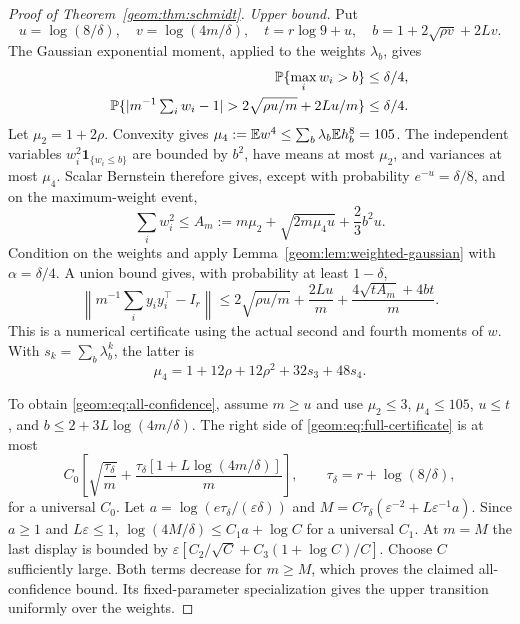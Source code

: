 \documentclass[11pt,a4paper]{article}
\theoremstyle{definition}\newtheorem{definition}[theorem]{Definition}
\theoremstyle{remark}\newtheorem{remark}[theorem]{Remark}
\numberwithin{equation}{section}
\begin{document}
\begin{proof}[Proof of Theorem~\ref{geom:thm:schmidt}]
\label{proof:schmidt}
\emph{Upper bound.}
Put
\[
 u=\log(8/\delta),\quad v=\log(4m/\delta),\quad
 t=r\log9+u,\quad b=1+2\sqrt{\rho v}+2Lv.
\]
The Gaussian exponential moment, applied to the weights $\lambda_b$,
gives
\begin{align*}
 \Pp\{\max_iw_i>b\}&\le\delta/4,\\
 \Pp\{|m^{-1}\textstyle\sum_iw_i-1|>
             2\sqrt{\rho u/m}+2Lu/m\}&\le\delta/4.
\end{align*}
Let $\mu_2=1+2\rho$. Convexity gives
$\mu_4:=\mathbb E w^4\le\sum_b\lambda_b\mathbb E h_b^8=105$.
The independent variables $w_i^2\mathbf1_{\{w_i\le b\}}$ are bounded
by $b^2$, have means at most $\mu_2$, and variances at most $\mu_4$.
Scalar Bernstein therefore gives, except with probability
$e^{-u}=\delta/8$, and on the maximum-weight event,
\begin{equation}\label{geom:eq:weight-squares}
 \sum_iw_i^2\le A_m:=m\mu_2+\sqrt{2m\mu_4u}+\frac23b^2u.
\end{equation}
Condition on the weights and apply Lemma~\ref{geom:lem:weighted-gaussian}
with $\alpha=\delta/4$. A union bound gives, with probability at least
$1-\delta$,
\begin{equation}\label{geom:eq:full-certificate}
 \left\|m^{-1}\sum_i y_iy_i^\top-I_r\right\|
 \le2\sqrt{\rho u/m}+\frac{2Lu}{m}
           +\frac{4\sqrt{tA_m}+4bt}{m}.
\end{equation}
This is a numerical certificate using the actual second and fourth
moments of $w$. With $s_k=\sum_b\lambda_b^k$, the latter is
\[
 \mu_4=1+12\rho+12\rho^2+32s_3+48s_4.
\]

To obtain \eqref{geom:eq:all-confidence}, assume $m\ge u$ and use
$\mu_2\le3$, $\mu_4\le105$, $u\le t$, and
$b\le2+3L\log(4m/\delta)$. The right side of
\eqref{geom:eq:full-certificate} is at most
\[
 C_0\left[\sqrt{\frac{\tau_\delta}{m}}+
              \frac{\tau_\delta[1+L\log(4m/\delta)]}{m}\right],
 \qquad \tau_\delta=r+\log(8/\delta),
\]
for a universal $C_0$. Let $a=\log(e\tau_\delta/(\varepsilon\delta))$ and
$M=C\tau_\delta(\varepsilon^{-2}+L\varepsilon^{-1}a)$.
Since $a\ge1$ and $L\varepsilon\le1$,
$\log(4M/\delta)\le C_1a+\log C$ for a universal $C_1$.
At $m=M$ the last display is bounded by
$\varepsilon[C_2/\sqrt C+C_3(1+\log C)/C]$.
Choose $C$ sufficiently large. Both terms decrease for $m\ge M$,
which proves the claimed all-confidence bound. Its fixed-parameter
specialization gives the upper transition uniformly over the weights.


\end{proof}
\end{document}
